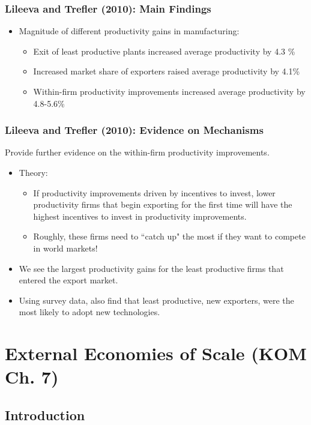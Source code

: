 \documentclass{beamer}
\begin{document}
\begin{frame}
	\frametitle{Lileeva and Trefler (2010): Main Findings}
	
	\begin{itemize}
		\item Magnitude of different productivity gains in manufacturing:
			\begin{itemize}
				\item Exit of least productive plants increased average productivity by 4.3 \%
				\item Increased market share of exporters raised average productivity by 4.1\%
				\item Within-firm productivity improvements increased average productivity by 4.8-5.6\%
		\end{itemize}
	\end{itemize}
\end{frame}

\begin{frame}
	\frametitle{Lileeva and Trefler (2010): Evidence on Mechanisms}
Provide further evidence on the within-firm productivity improvements. 
				\begin{itemize}
					\item Theory: 
						\begin{itemize}
							\item If productivity improvements driven by incentives to invest, lower productivity firms that begin exporting for the first time will have the highest incentives to invest in productivity improvements.
							\item Roughly, these firms need to ``catch up" the most if they want to compete in world markets!
						\end{itemize}
					\item We see the largest productivity gains for the least productive firms that entered the export market. 
					\item Using survey data, also find that least productive, new exporters, were the most likely to adopt new technologies. 
				\end{itemize}
\end{frame}



\section{External Economies of Scale (KOM Ch. 7)}

\subsection{Introduction}
\end{document}
